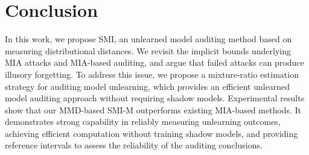 \documentclass{article}
\theoremstyle{plain}
\theoremstyle{definition}
\theoremstyle{remark}
\begin{document}
\begin{table}[h]
\centering
\caption{SMI-based Detection of Unlearning Levels in Practical Unlearning Tasks}
\label{tab:comparison_cifar100_cinic}
\end{table}





\section{Conclusion}
In this work, we propose SMI, an unlearned model auditing method based on measuring distributional distances. We revisit the implicit bounds underlying MIA attacks and MIA-based auditing, and argue that failed attacks can produce illusory forgetting. To address this issue, we propose a mixture-ratio estimation strategy for auditing model unlearning, which provides an efficient unlearned model auditing approach without requiring shadow models. Experimental results show that our MMD-based SMI-M outperforms existing MIA-based methods. It demonstrates strong capability in reliably measuring unlearning outcomes, achieving efficient computation without training shadow models, and providing reference intervals to assess the reliability of the auditing conclusions.
\end{document}
